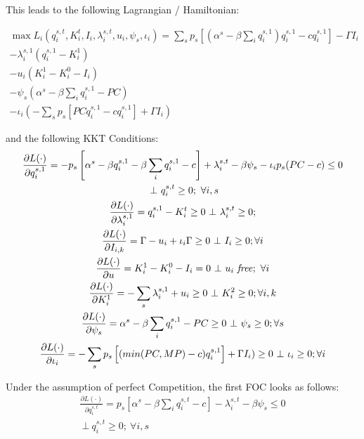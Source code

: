 \documentclass[a4paper,12pt]{article}
\theoremstyle{remark}
\begin{document}
\clearpage

This leads to the following Lagrangian / Hamiltonian:

\begin{gather}
	\max L_i(q_{i}^{s,t},K^t_{i},I_{i},\lambda_{i}^{s,t},u_{i}, \psi_s, \iota_i)= 
	 \sum_s p_s \left[(\alpha^s- \beta \sum_i q_{i}^{s,1}) q_{i}^{s,1} - c q_{i}^{s,1}  \right]	- \Gamma I_{i}  \\ \nonumber  
	  	- \lambda_{i}^{s,1}(q_{i}^{s,1} - K^{1}_{i}) \\ \nonumber
			- u_{i}(K^{1}_{i}  - K^{0}_{i}  - I_{i})		\\   \nonumber
			- \psi_s (\alpha^s - \beta  \sum_i q_i^{s,1} - PC ) \\ \nonumber
			-\iota_i (-\sum_s p_s \left[ PC q_{i}^{s,1} - c q_{i}^{s,1} \right] + \Gamma I_{i})	\nonumber			
\end{gather}

and the following KKT Conditions:
\begin{gather}
\frac{\partial L(\cdot)}{\partial q_{i}^{s,1}} = - p_s \left[ \alpha^s - \beta q_{i}^{s,1} - \beta \sum_i q_{i}^{s,1} - c \right] + \lambda_{i}^{s,t} - \beta \psi_s - \iota_i p_s (PC-c) \leq 0 \\ \nonumber \ \bot \ q_{i}^{s,t} \geq 0;\ \forall i,s \\
\frac{\partial L(\cdot)}{\partial \lambda_{i}^{s,1}} =  q_{i}^{s,1} - K^t_{i} \geq 0 \ \bot \ \lambda_{i}^{s,t} \geq 0 ; \\
\frac{\partial L(\cdot)}{\partial I_{i,k}} =  \Gamma - u_{i} + \iota_{i} \Gamma \geq 0 \ \bot \ I_{i} \geq 0 ;\forall i \\
\frac{\partial L(\cdot)}{\partial u} = K^1_{i} -  K^0_{i} - I_{i}  = 0 \ \bot \ u_{i} \ \mbox{\textit{free}}; \  \forall i  \\
\frac{\partial L(\cdot)}{\partial K^1_{i}} = -\sum_s  \lambda_{i}^{s,1} + u_{i} \geq 0  \ \bot \ K^2_{i} \geq 0 ; \forall i,k \\
\frac{\partial L(\cdot)}{\partial \psi_s} = \alpha^s - \beta  \sum_i q_i^{s,1} - PC   \geq 0  \ \bot \ \psi_s \geq 0 ; \forall s \\
\frac{\partial L(\cdot)}{\partial \iota_i} = - \sum_s p_s \left[ (min(PC,MP) - c) q_{i}^{s,1} \right] + \Gamma I_{i})  \geq 0  \ \bot \ \iota_i \geq 0 ; \forall i \\
\end{gather}

Under the assumption of perfect Competition, the first FOC looks as follows:
\begin{gather}
\frac{\partial L(\cdot)}{\partial q_{i}^{s,t}} = p_s \left[ \alpha^s -  \beta \sum_i q_{i}^{s,t} - c \right] - \lambda_{i}^{s,t} - \beta \psi_s \leq 0 \\ \nonumber \ \bot \ q_{i}^{s,t} \geq 0;\ \forall i,s \\
\end{gather}
\end{document}
